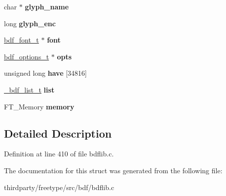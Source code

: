 \begin{DoxyCompactItemize}
\mbox{\label{struct__bdf__parse__t___a560d3bcbd19cb55f00d1d746bbe0e14e}} 
char $\ast$ {\bfseries glyph\+\_\+name}
\item 
\mbox{\label{struct__bdf__parse__t___a97a41007b94e592c2a93e8ad71c6b108}} 
long {\bfseries glyph\+\_\+enc}
\item 
\mbox{\label{struct__bdf__parse__t___ae6adc34a634532de3f66b9c71d888c1b}} 
\hyperlink{structbdf__font__t__}{bdf\+\_\+font\+\_\+t} $\ast$ {\bfseries font}
\item 
\mbox{\label{struct__bdf__parse__t___a93d86e0ca12102ea7c9716f5d3b8892c}} 
\hyperlink{structbdf__options__t__}{bdf\+\_\+options\+\_\+t} $\ast$ {\bfseries opts}
\item 
\mbox{\label{struct__bdf__parse__t___a06049fd4ceea450fa761d9323100ab0c}} 
unsigned long {\bfseries have} \mbox{[}34816\mbox{]}
\item 
\mbox{\label{struct__bdf__parse__t___ae3119dc8be798b09cb9a7590b775e664}} 
\hyperlink{struct__bdf__list__t__}{\+\_\+bdf\+\_\+list\+\_\+t} {\bfseries list}
\item 
\mbox{\label{struct__bdf__parse__t___a9920b46659932e5f73617ad63a7c1706}} 
F\+T\+\_\+\+Memory {\bfseries memory}
\end{DoxyCompactItemize}


\subsection{Detailed Description}


Definition at line 410 of file bdflib.\+c.



The documentation for this struct was generated from the following file\+:\begin{DoxyCompactItemize}
\item 
thirdparty/freetype/src/bdf/bdflib.\+c\end{DoxyCompactItemize}
